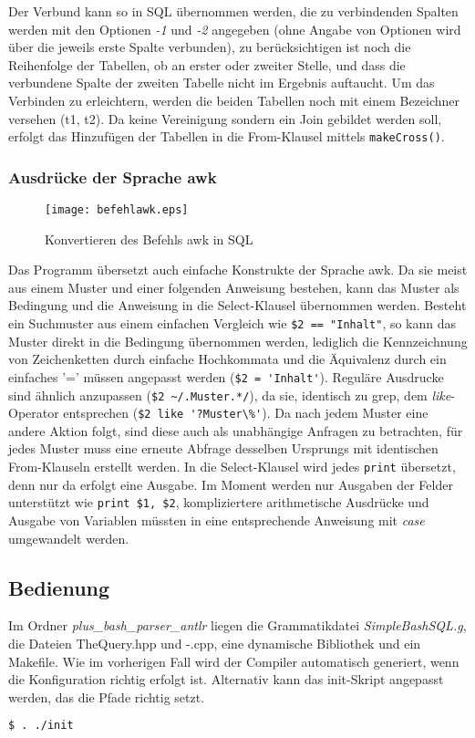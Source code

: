 Der Verbund kann so in SQL übernommen werden, die zu verbindenden Spalten werden mit den Optionen \textit{-1} und \textit{-2} angegeben (ohne Angabe von Optionen wird über die jeweils erste Spalte verbunden), zu berücksichtigen ist noch die Reihenfolge der Tabellen, ob an erster oder zweiter Stelle, und dass die verbundene Spalte der zweiten Tabelle nicht im Ergebnis auftaucht. Um das Verbinden zu erleichtern, werden die beiden Tabellen noch mit einem Bezeichner versehen (t1, t2). Da keine Vereinigung sondern ein Join gebildet werden soll, erfolgt das Hinzufügen der Tabellen in die From-Klausel mittels \lstinline{makeCross()}.

\subsubsection{Ausdrücke der Sprache awk}

\begin{figure}[h]
\centering
\texttt{[image: befehlawk.eps]}
\caption{Konvertieren des Befehls awk in SQL}
\label{fig:awk}
\end{figure}

Das Programm übersetzt auch einfache Konstrukte der Sprache awk. Da sie meist aus einem Muster und einer folgenden Anweisung bestehen, kann das Muster als Bedingung und die Anweisung in die Select-Klausel übernommen werden. Besteht ein Suchmuster aus einem einfachen Vergleich wie
\lstinline{$2 == "Inhalt"},
so kann das Muster direkt in die Bedingung übernommen werden, lediglich die Kennzeichnung von Zeichenketten durch einfache Hochkommata und die Äquivalenz durch ein einfaches '=' müssen angepasst werden (\lstinline{$2 = 'Inhalt'}). Reguläre Ausdrucke sind ähnlich anzupassen (\lstinline{$2 ~/.Muster.*/}), da sie, identisch zu grep, dem \textit{like}-Operator entsprechen (\lstinline{$2 like '?Muster\%'}).
Da nach jedem Muster eine andere Aktion folgt, sind diese auch als unabhängige Anfragen zu betrachten, für jedes Muster muss eine erneute Abfrage desselben Ursprungs mit identischen From-Klauseln erstellt werden. In die Select-Klausel wird jedes \lstinline{print} übersetzt, denn nur da erfolgt eine Ausgabe. Im Moment werden nur Ausgaben der Felder unterstützt wie \lstinline{print $1, $2}, kompliziertere arithmetische Ausdrücke und Ausgabe von Variablen müssten in eine entsprechende Anweisung mit \textit{case} umgewandelt werden.

\subsection{Bedienung}
Im Ordner \textit{plus\_bash\_parser\_antlr} liegen die Grammatikdatei \textit{SimpleBashSQL.g}, die Dateien TheQuery.hpp und -.cpp, eine dynamische Bibliothek und ein Makefile. Wie im vorherigen Fall wird der Compiler automatisch generiert, wenn die Konfiguration richtig erfolgt ist. Alternativ kann das init-Skript angepasst werden, das die Pfade richtig setzt.
\begin{lstlisting}[language=Bash]
$ . ./init
\end{lstlisting}

